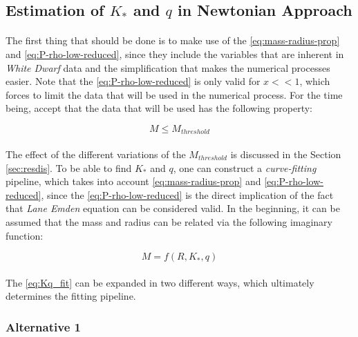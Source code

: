 \documentclass[letterpaper,12pt]{article}
\begin{document}
\subsection{Estimation of $K_*$ and $q$ in Newtonian Approach}
\label{sec:Kq_fit}
\paragraph{} The first thing that should be done is to make use of the \eqref{eq:mass-radius-prop} and \eqref{eq:P-rho-low-reduced}, since they include the variables that are inherent in \textit{White Dwarf} data and the simplification that makes the numerical processes easier. Note that the \eqref{eq:P-rho-low-reduced} is only valid for $x<<1$, which forces to limit the data that will be used in the numerical process. For the time being, accept that the data that will be used has the following property:

\begin{equation*}
    M \leqslant M_{threshold}
\end{equation*}

\paragraph{} The effect of the different variations of the $M_{threshold}$ is discussed in the Section \ref{sec:resdis}. To be able to find $K_*$ and $q$, one can construct a \textit{curve-fitting} pipeline, which takes into account \eqref{eq:mass-radius-prop} and \eqref{eq:P-rho-low-reduced}, since the \eqref{eq:P-rho-low-reduced} is the direct implication of the fact that \textit{Lane Emden} equation can be considered valid. In the beginning, it can be assumed that the mass and radius can be related via the following imaginary function:

\begin{equation}
    \label{eq:Kq_fit}
    M = f(R, K_*, q)
\end{equation}

\paragraph{} The \eqref{eq:Kq_fit} can be expanded in two different ways, which ultimately determines the fitting pipeline.

\subsubsection{Alternative 1}
\label{sec:Kq_fit_a1}
\end{document}
